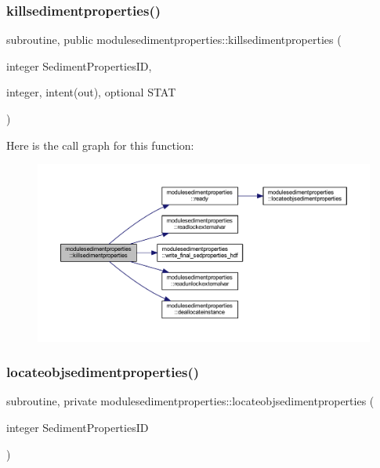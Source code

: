 \subsubsection{\texorpdfstring{killsedimentproperties()}{killsedimentproperties()}}
{\footnotesize\ttfamily subroutine, public modulesedimentproperties\+::killsedimentproperties (\begin{DoxyParamCaption}\item[{integer}]{Sediment\+Properties\+ID,  }\item[{integer, intent(out), optional}]{S\+T\+AT }\end{DoxyParamCaption})}

Here is the call graph for this function\+:\nopagebreak
\begin{figure}[H]
\begin{center}
\leavevmode
\includegraphics[width=350pt]{namespacemodulesedimentproperties_a69dda6f50e9b65498825a76aa325a968_cgraph}
\end{center}
\end{figure}
\mbox{\label{namespacemodulesedimentproperties_a8bdf617b0165523af238758f5b5a5767}} 
\subsubsection{\texorpdfstring{locateobjsedimentproperties()}{locateobjsedimentproperties()}}
{\footnotesize\ttfamily subroutine, private modulesedimentproperties\+::locateobjsedimentproperties (\begin{DoxyParamCaption}\item[{integer}]{Sediment\+Properties\+ID }\end{DoxyParamCaption})\hspace{0.3cm}{\ttfamily [private]}}

